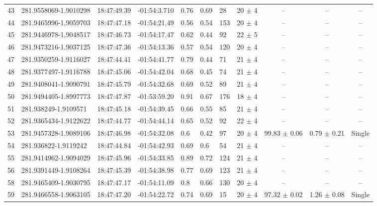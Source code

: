 \documentclass[longauth]{aa} %
\begin{document}
\begin{appendix}
\begin{table}[htbp!]
\begin{tabular}{llllllllccc}
43  &  281.9558069-1.9010298  &  18:47:49.39  &  -01:54:3.710  &  0.76  &  0.69  &  28  &  20 $\pm$ 4  &  --  &  --  &  -- \\
44  &  281.9465996-1.9059703  &  18:47:47.18  &  -01:54:21.49  &  0.56  &  0.54  &  153  &  20 $\pm$ 4  &  --  &  --  &  -- \\
45  &  281.9446978-1.9048517  &  18:47:46.73  &  -01:54:17.47  &  0.62  &  0.44  &  92  &  22 $\pm$ 5  &  --  &  --  &  -- \\
46  &  281.9473216-1.9037125  &  18:47:47.36  &  -01:54:13.36  &  0.57  &  0.54  &  120  &  20 $\pm$ 4  &  --  &  --  &  -- \\
47  &  281.9350259-1.9116027  &  18:47:44.41  &  -01:54:41.77  &  0.79  &  0.44  &  71  &  21 $\pm$ 4  &  --  &  --  &  -- \\
48  &  281.9377497-1.9116788  &  18:47:45.06  &  -01:54:42.04  &  0.68  &  0.45  &  74  &  21 $\pm$ 4  &  --  &  --  &  -- \\
49  &  281.9408041-1.9090791  &  18:47:45.79  &  -01:54:32.68  &  0.69  &  0.52  &  89  &  21 $\pm$ 4  &  --  &  --  &  -- \\
50  &  281.9494405-1.8997773  &  18:47:47.87  &  -01:53:59.20  &  0.91  &  0.67  &  176  &  18 $\pm$ 4  &  --  &  --  &  -- \\
51  &  281.938249-1.9109571  &  18:47:45.18  &  -01:54:39.45  &  0.66  &  0.55  &  85  &  21 $\pm$ 4  &  --  &  --  &  -- \\
52  &  281.9365434-1.9122622  &  18:47:44.77  &  -01:54:44.14  &  0.65  &  0.52  &  92  &  22 $\pm$ 4  &  --  &  --  &  -- \\
53  &  281.9457328-1.9089106  &  18:47:46.98  &  -01:54:32.08  &  0.6  &  0.42  &  97  &  20 $\pm$ 4  &  99.83 $\pm$ 0.06  &  0.79 $\pm$ 0.21  &  Single \\
54  &  281.936822-1.9119242  &  18:47:44.84  &  -01:54:42.93  &  0.69  &  0.6  &  54  &  21 $\pm$ 4  &  --  &  --  &  -- \\
55  &  281.9414962-1.9094029  &  18:47:45.96  &  -01:54:33.85  &  0.89  &  0.72  &  124  &  21 $\pm$ 4  &  --  &  --  &  -- \\
56  &  281.9391449-1.9108264  &  18:47:45.39  &  -01:54:38.98  &  0.77  &  0.69  &  123  &  21 $\pm$ 4  &  --  &  --  &  -- \\
58  &  281.9465409-1.9030795  &  18:47:47.17  &  -01:54:11.09  &  0.8  &  0.66  &  130  &  20 $\pm$ 4  &  --  &  --  &  -- \\
59  &  281.9466558-1.9063105  &  18:47:47.20  &  -01:54:22.72  &  0.74  &  0.69  &  15  &  20 $\pm$ 4  &  97.32 $\pm$ 0.02  &  1.26 $\pm$ 0.08  &  Single \\

\end{tabular}
\end{table}
\end{appendix}
\end{document}
